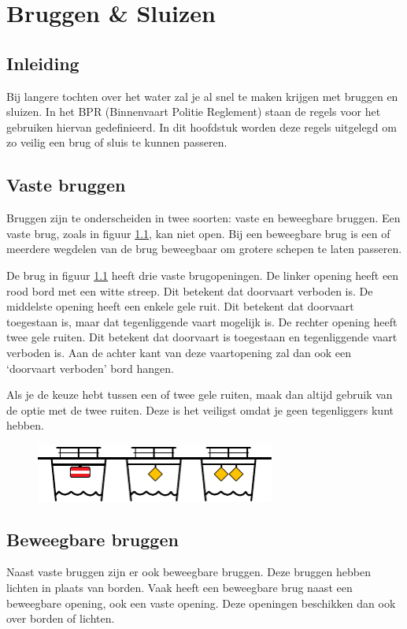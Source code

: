 \chapter{Bruggen \& Sluizen}
\section{Inleiding}
Bij langere tochten over het water zal je al snel te maken krijgen met bruggen en sluizen. In het BPR (Binnenvaart Politie Reglement) staan de regels voor het gebruiken hiervan gedefinieerd. In dit hoofdstuk worden deze regels uitgelegd om zo veilig een brug of sluis te kunnen passeren.

\section{Vaste bruggen}
Bruggen zijn te onderscheiden in twee soorten: vaste en beweegbare bruggen. Een vaste brug, zoals in figuur \ref{pic:brug:vast}, kan niet open. Bij een beweegbare brug is een of meerdere wegdelen van de brug beweegbaar om grotere schepen te laten passeren. 

De brug in figuur \ref{pic:brug:vast} heeft drie vaste brugopeningen. De linker opening heeft een rood bord met een witte streep. Dit betekent dat doorvaart verboden is. De middelste opening heeft een enkele gele ruit. Dit betekent dat doorvaart toegestaan is, maar dat tegenliggende vaart mogelijk is. De rechter opening heeft twee gele ruiten. Dit betekent dat doorvaart is toegestaan en tegenliggende vaart verboden is. Aan de achter kant van deze vaartopening zal dan ook een `doorvaart verboden' bord hangen. 

Als je de keuze hebt tussen een of twee gele ruiten, maak dan altijd gebruik van de optie met de twee ruiten. Deze is het veiligst omdat je geen tegenliggers kunt hebben.
\begin{figure}[ht!]
  \centering
    \includegraphics[width=0.7\textwidth]{Hoofdstukken/Bruggen/pdf/brug_vast.pdf}
    \caption{}
    \label{pic:brug:vast}
\end{figure}

\section{Beweegbare bruggen}
Naast vaste bruggen zijn er ook beweegbare bruggen. Deze bruggen hebben lichten in plaats van borden. Vaak heeft een beweegbare brug naast een beweegbare opening, ook een vaste opening. Deze openingen beschikken dan ook over borden of lichten.  

